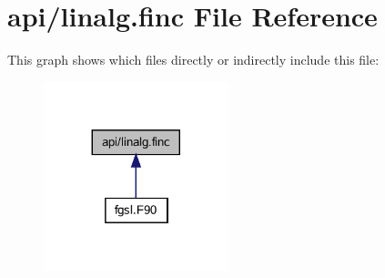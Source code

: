 \hypertarget{linalg_8finc}{}\section{api/linalg.finc File Reference}
\label{linalg_8finc}
This graph shows which files directly or indirectly include this file\+:\nopagebreak
\begin{figure}[H]
\begin{center}
\leavevmode
\includegraphics[width=152pt]{linalg_8finc__dep__incl}
\end{center}
\end{figure}
